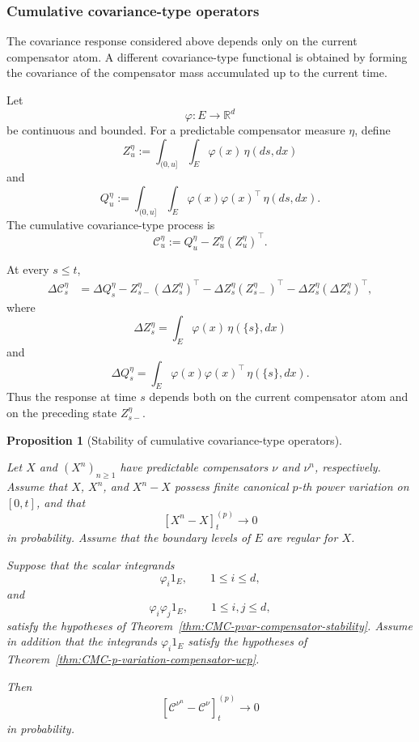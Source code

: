 \documentclass[a4paper,10pt]{article}
\newtheorem{prop}[thm]{Proposition}
\begin{document}
\subsubsection{Cumulative covariance-type operators}

The covariance response considered above depends only on the current
compensator atom. A different covariance-type functional is obtained
by forming the covariance of the compensator mass accumulated up to
the current time.

Let
\[
        \varphi:E\longrightarrow\mathbb R^d
\]
be continuous and bounded. For a predictable compensator measure
\(\eta\), define
\[
Z_u^\eta
:=
\int_{(0,u]}\int_E
\varphi(x)\,\eta(ds,dx)
\]
and
\[
Q_u^\eta
:=
\int_{(0,u]}\int_E
\varphi(x)\varphi(x)^\top\,\eta(ds,dx).
\]
The cumulative covariance-type process is
\[
        \mathcal C_u^\eta
        :=
        Q_u^\eta-Z_u^\eta(Z_u^\eta)^\top.
\]

At every \(s\le t\),
\[
\begin{aligned}
\Delta\mathcal C_s^\eta
&=
\Delta Q_s^\eta
-
Z_{s-}^\eta(\Delta Z_s^\eta)^\top
-
\Delta Z_s^\eta(Z_{s-}^\eta)^\top
-
\Delta Z_s^\eta(\Delta Z_s^\eta)^\top,
\end{aligned}
\]
where
\[
        \Delta Z_s^\eta
        =
        \int_E\varphi(x)\,\eta(\{s\},dx)
\]
and
\[
        \Delta Q_s^\eta
        =
        \int_E
        \varphi(x)\varphi(x)^\top\,\eta(\{s\},dx).
\]
Thus the response at time \(s\) depends both on the current
compensator atom and on the preceding state \(Z_{s-}^\eta\).

\begin{prop}[Stability of cumulative covariance-type operators]
\label{prop:cumulative-covariance-stability}

Let \(X\) and \((X^n)_{n\ge1}\) have predictable compensators
\(\nu\) and \(\nu^n\), respectively. Assume that \(X\), \(X^n\), and
\(X^n-X\) possess finite canonical \(p\)-th power variation on
\([0,t]\), and that
\[
        [X^n-X]^{(p)}_t\longrightarrow0
\]
in probability. Assume that the boundary levels of \(E\) are regular
for \(X\).

Suppose that the scalar integrands
\[
        \varphi_i1_E,
        \qquad 1\le i\le d,
\]
and
\[
        \varphi_i\varphi_j1_E,
        \qquad 1\le i,j\le d,
\]
satisfy the hypotheses of
Theorem~\ref{thm:CMC-pvar-compensator-stability}. Assume in addition
that the integrands \(\varphi_i1_E\) satisfy the hypotheses of
Theorem~\ref{thm:CMC-p-variation-compensator-ucp}.

Then
\[
        [\mathcal C^{\nu^n}-\mathcal C^\nu]^{(p)}_t
        \longrightarrow0
\]
in probability.
\end{prop}
\end{document}
